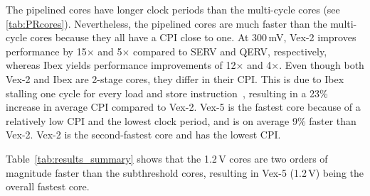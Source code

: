 The pipelined cores have longer clock periods than the multi-cycle cores (see \autoref{tab:PRcores}).
Nevertheless, the pipelined cores are much faster than the multi-cycle cores because they all have a CPI close to one. At 300\,mV, Vex-2 improves performance by 15$\times$ and 5$\times$ compared to SERV and QERV, respectively, whereas Ibex yields performance improvements of 12$\times$ and 4$\times$.  Even though both Vex-2 and Ibex are 2-stage cores, they differ in their CPI.  This is due to Ibex stalling one cycle for every load and store instruction~\cite{ibex_pipeline}, resulting in a 23\% increase in average CPI compared to Vex-2. 
Vex-5 is the fastest core because of a relatively low CPI and the lowest clock period, and is on average 9\% faster than Vex-2.  Vex-2 is the second-fastest core and has the lowest CPI.

Table~\ref{tab:results_summary} shows that the 1.2\,V cores are two orders of magnitude faster than the subthreshold cores, resulting in Vex-5 (1.2\,V) being the overall fastest core. 

\begin{table*}[tp]
  \centering
  \caption{Instance count and timing for the critical path.}
  \label{tab:critical_path}
\end{table*}

